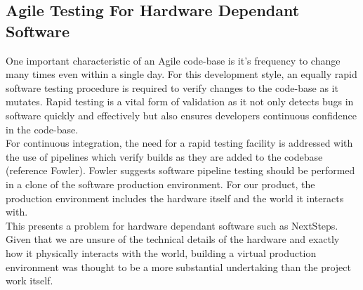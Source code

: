 \documentclass{l3proj}
\begin{document}
\subsection{Agile Testing For Hardware Dependant Software}
One important characteristic of an Agile code-base is it's frequency to change many times even within a single day.
 For this development style, an equally rapid software testing procedure is required to verify changes to the code-base as it mutates. 
 Rapid testing is a vital form of validation as it not only detects bugs in software quickly and effectively but also ensures developers continuous confidence in the code-base.
\\ For continuous integration, the need for a rapid testing facility is addressed with the use of pipelines which verify builds as they are added to the codebase (reference Fowler). 
Fowler suggests software pipeline testing should be performed in a clone of the software production environment. For our product, the production environment includes the hardware itself and the world it interacts with. 
\\This presents a problem for hardware dependant software such as NextSteps. Given that we are unsure of the technical details of the hardware and exactly how it physically interacts with the world, building a virtual production environment was thought to be a more substantial undertaking than the project work itself. 
\end{document}
